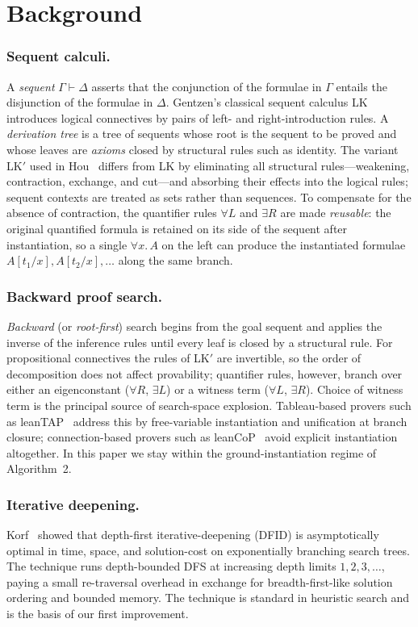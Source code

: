 \section{Background}\label{sec:background}
\subsubsection{Sequent calculi.}
A \emph{sequent} $\Gamma\vdash\Delta$ asserts that the conjunction of the
formulae in $\Gamma$ entails the disjunction of the formulae in
$\Delta$. Gentzen's classical sequent calculus
LK~\cite{gentzen1935untersuchungen} introduces logical connectives by pairs
of left- and right-introduction rules. A \emph{derivation tree} is a tree of
sequents whose root is the sequent to be proved and whose leaves are
\emph{axioms} closed by structural rules such as identity. The variant
LK$'$ used in Hou~\cite{hou2021fundamentals} differs from LK by eliminating
all structural rules---weakening, contraction, exchange, and cut---and
absorbing their effects into the logical rules; sequent contexts are treated
as sets rather than sequences. To compensate for the absence of contraction,
the quantifier rules $\forall L$ and $\exists R$ are made \emph{reusable}:
the original quantified formula is retained on its side of the sequent after
instantiation, so a single $\forall x.\,A$ on the left can produce the
instantiated formulae $A[t_1/x], A[t_2/x],\ldots$ along the same branch.


\subsubsection{Backward proof search.}
\emph{Backward} (or \emph{root-first}) search begins from the goal sequent
and applies the inverse of the inference rules until every leaf is closed
by a structural rule. For propositional connectives the rules of LK$'$ are
invertible, so the order of decomposition does not affect provability;
quantifier rules, however, branch over either an eigenconstant
($\forall R$, $\exists L$) or a witness term ($\forall L$, $\exists R$).
Choice of witness term is the principal source of search-space explosion.
Tableau-based provers such as leanTAP~\cite{beckert1995leantap} address
this by free-variable instantiation and unification at branch closure;
connection-based provers such as leanCoP~\cite{otten2003leancop} avoid
explicit instantiation altogether. In this paper we stay within the
ground-instantiation regime of Algorithm~2.

\subsubsection{Iterative deepening.}
Korf~\cite{korf1985iterative} showed that depth-first iterative-deepening
(DFID) is asymptotically optimal in time, space, and solution-cost on
exponentially branching search trees. The technique runs depth-bounded DFS
at increasing depth limits $1, 2, 3, \ldots$, paying a small re-traversal
overhead in exchange for breadth-first-like solution ordering and bounded
memory. The technique is standard in heuristic search and is the basis of
our first improvement.
